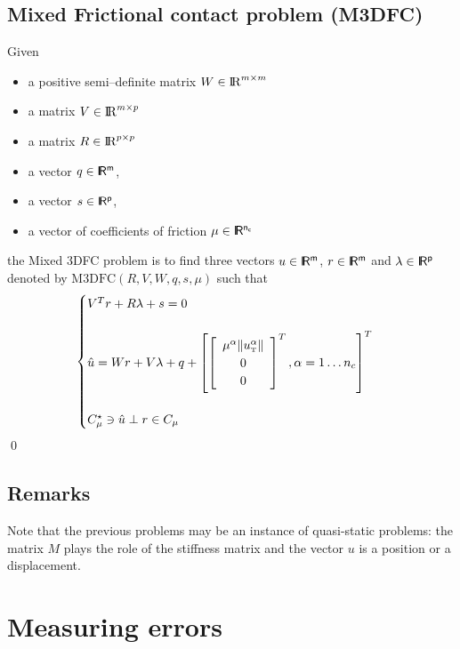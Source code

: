 \documentclass[a4paper,10pt]{article}
\begin{document}
\subsection{ Mixed Frictional contact problem (M3DFC)}
\begin{definition}
  Given
  \begin{itemize}
    \item a positive semi--definite matrix  ${W} \in \mathrm{I\!R}^{m \times m}$
    \item a matrix  ${V} \in \mathrm{I\!R}^{m \times p}$
    \item a matrix  ${R} \in \mathrm{I\!R}^{p \times p}$
     \item a vector $q \in \rm\sf I\!R^{m}$,
     \item a vector $s \in \rm\sf I\!R^{p}$,
    \item a vector of coefficients of friction $\mu \in \rm\sf I\!R^{n_c}$
  \end{itemize}
 the  Mixed 3DFC problem  is to find three vectors $u\in\rm\sf I\!R^m$, $r\in \rm\sf I\!R^m$ and $\lambda \in \rm\sf I\!R^p$ denoted by $\mathrm{M3DFC}(R,V,W,q,s,\mu)$  such that
\begin{equation}\label{eq:lcp1}
  \begin{cases}
    V^T {r} + R \lambda + s = 0 \\ \\
    \hat u = W {r}    + V\lambda  + q +\left[
      \left[\begin{array}{c}
        \mu^\alpha \|u^\alpha_{\hbox{\tiny{T}}}\|\\
        0 \\
        0
      \end{array}\right]^T, \alpha = 1 \ldots n_c
\right]^T \\ \\
    C^\star_{\mu} \ni {\hat u} \perp r \in C_{\mu}
  \end{cases}
\end{equation}
\qed
\end{definition}



\subsection{Remarks}


Note that the previous problems may be an instance of quasi-static problems: the matrix $M$ plays the role of the stiffness matrix and the vector $u$ is a position or a displacement. 
\section{Measuring errors}
\end{document}
